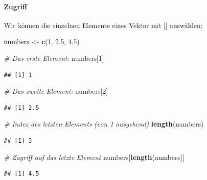 \documentclass[
]{article}
\newenvironment{Shaded}{\begin{snugshade}}{\end{snugshade}}
\newcommand{\CommentTok}[1]{\textcolor[rgb]{0.56,0.35,0.01}{\textit{#1}}}
\newcommand{\DecValTok}[1]{\textcolor[rgb]{0.00,0.00,0.81}{#1}}
\newcommand{\FloatTok}[1]{\textcolor[rgb]{0.00,0.00,0.81}{#1}}
\newcommand{\FunctionTok}[1]{\textcolor[rgb]{0.13,0.29,0.53}{\textbf{#1}}}
\newcommand{\NormalTok}[1]{#1}
\newcommand{\OtherTok}[1]{\textcolor[rgb]{0.56,0.35,0.01}{#1}}
\begin{document}
\hypertarget{zugriff}{%
\paragraph{Zugriff}\label{zugriff}}

Wir können die einzelnen Elemente eines Vektor mit {[}{]} auswählen:

\begin{Shaded}
\begin{Highlighting}[]
\NormalTok{numbers }\OtherTok{\textless{}{-}} \FunctionTok{c}\NormalTok{(}\DecValTok{1}\NormalTok{, }\FloatTok{2.5}\NormalTok{, }\FloatTok{4.5}\NormalTok{) }

\CommentTok{\# Das erste Element:}
\NormalTok{numbers[}\DecValTok{1}\NormalTok{]}
\end{Highlighting}
\end{Shaded}

\begin{verbatim}
## [1] 1
\end{verbatim}

\begin{Shaded}
\begin{Highlighting}[]
\CommentTok{\# Das zweite Element:}
\NormalTok{numbers[}\DecValTok{2}\NormalTok{]}
\end{Highlighting}
\end{Shaded}

\begin{verbatim}
## [1] 2.5
\end{verbatim}

\begin{Shaded}
\begin{Highlighting}[]
\CommentTok{\# Index des letzten Elements (von 1 ausgehend)}
\FunctionTok{length}\NormalTok{(numbers)}
\end{Highlighting}
\end{Shaded}

\begin{verbatim}
## [1] 3
\end{verbatim}

\begin{Shaded}
\begin{Highlighting}[]
\CommentTok{\# Zugriff auf das letzte Element}
\NormalTok{numbers[}\FunctionTok{length}\NormalTok{(numbers)]}
\end{Highlighting}
\end{Shaded}

\begin{verbatim}
## [1] 4.5
\end{verbatim}
\end{document}

